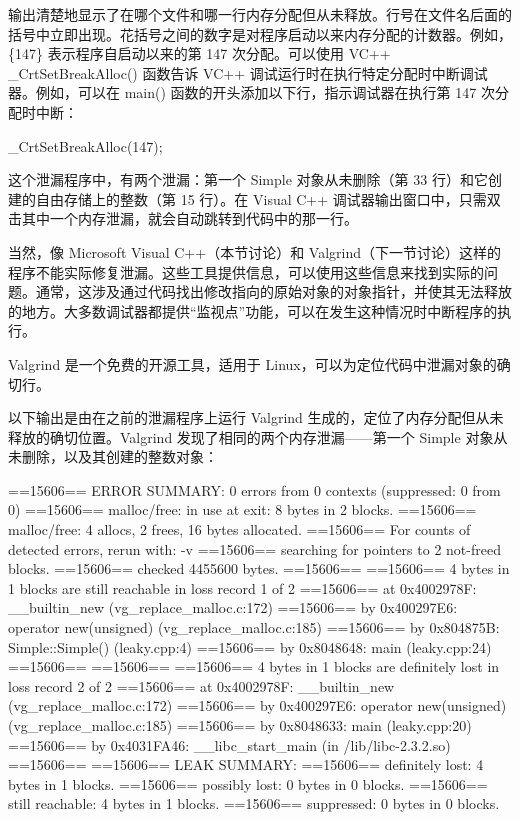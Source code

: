 输出清楚地显示了在哪个文件和哪一行内存分配但从未释放。行号在文件名后面的括号中立即出现。花括号之间的数字是对程序启动以来内存分配的计数器。例如，\{147\} 表示程序自启动以来的第 147 次分配。可以使用 VC++ \_CrtSetBreakAlloc() 函数告诉 VC++ 调试运行时在执行特定分配时中断调试器。例如，可以在 main() 函数的开头添加以下行，指示调试器在执行第 147 次分配时中断：

\begin{cpp}
_CrtSetBreakAlloc(147);
\end{cpp}

这个泄漏程序中，有两个泄漏：第一个 Simple 对象从未删除（第 33 行）和它创建的自由存储上的整数（第 15 行）。在 Visual C++ 调试器输出窗口中，只需双击其中一个内存泄漏，就会自动跳转到代码中的那一行。

当然，像 Microsoft Visual C++（本节讨论）和 Valgrind（下一节讨论）这样的程序不能实际修复泄漏。这些工具提供信息，可以使用这些信息来找到实际的问题。通常，这涉及通过代码找出修改指向的原始对象的对象指针，并使其无法释放的地方。大多数调试器都提供“监视点”功能，可以在发生这种情况时中断程序的执行。


Valgrind 是一个免费的开源工具，适用于 Linux，可以为定位代码中泄漏对象的确切行。

以下输出是由在之前的泄漏程序上运行 Valgrind 生成的，定位了内存分配但从未释放的确切位置。Valgrind 发现了相同的两个内存泄漏——第一个 Simple 对象从未删除，以及其创建的整数对象：

\begin{shell}
==15606== ERROR SUMMARY: 0 errors from 0 contexts (suppressed: 0 from 0)
==15606== malloc/free: in use at exit: 8 bytes in 2 blocks.
==15606== malloc/free: 4 allocs, 2 frees, 16 bytes allocated.
==15606== For counts of detected errors, rerun with: -v
==15606== searching for pointers to 2 not-freed blocks.
==15606== checked 4455600 bytes.
==15606==
==15606== 4 bytes in 1 blocks are still reachable in loss record 1 of 2
==15606==    at 0x4002978F: __builtin_new (vg_replace_malloc.c:172)
==15606==    by 0x400297E6: operator new(unsigned) (vg_replace_malloc.c:185)
==15606==    by 0x804875B: Simple::Simple() (leaky.cpp:4)
==15606==    by 0x8048648: main (leaky.cpp:24)
==15606==
==15606==
==15606== 4 bytes in 1 blocks are definitely lost in loss record 2 of 2
==15606==    at 0x4002978F: __builtin_new (vg_replace_malloc.c:172)
==15606==    by 0x400297E6: operator new(unsigned) (vg_replace_malloc.c:185)
==15606==    by 0x8048633: main (leaky.cpp:20)
==15606==    by 0x4031FA46: __libc_start_main (in /lib/libc-2.3.2.so)
==15606==
==15606== LEAK SUMMARY:
==15606==     definitely lost: 4 bytes in 1 blocks.
==15606==     possibly lost:   0 bytes in 0 blocks.
==15606==     still reachable: 4 bytes in 1 blocks.
==15606==          suppressed: 0 bytes in 0 blocks.
\end{shell}

